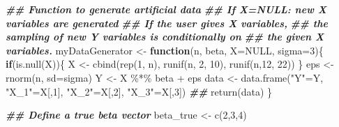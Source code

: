 \documentclass[
  14pt,
]{memoir}
\newenvironment{Shaded}{\begin{snugshade}}{\end{snugshade}}
\newcommand{\AttributeTok}[1]{\textcolor[rgb]{0.77,0.63,0.00}{#1}}
\newcommand{\ConstantTok}[1]{\textcolor[rgb]{0.00,0.00,0.00}{#1}}
\newcommand{\ControlFlowTok}[1]{\textcolor[rgb]{0.13,0.29,0.53}{\textbf{#1}}}
\newcommand{\DecValTok}[1]{\textcolor[rgb]{0.00,0.00,0.81}{#1}}
\newcommand{\DocumentationTok}[1]{\textcolor[rgb]{0.56,0.35,0.01}{\textbf{\textit{#1}}}}
\newcommand{\FunctionTok}[1]{\textcolor[rgb]{0.00,0.00,0.00}{#1}}
\newcommand{\NormalTok}[1]{#1}
\newcommand{\OtherTok}[1]{\textcolor[rgb]{0.56,0.35,0.01}{#1}}
\newcommand{\SpecialCharTok}[1]{\textcolor[rgb]{0.00,0.00,0.00}{#1}}
\newcommand{\StringTok}[1]{\textcolor[rgb]{0.31,0.60,0.02}{#1}}
\begin{document}
\begin{Shaded}
\begin{Highlighting}[]
\DocumentationTok{\#\# Function to generate artificial data}
\DocumentationTok{\#\# If X=NULL: new X variables are generated}
\DocumentationTok{\#\# If the user gives X variables, }
\DocumentationTok{\#\# the sampling of new Y variables is conditionally on }
\DocumentationTok{\#\# the given X variables.}
\NormalTok{myDataGenerator }\OtherTok{\textless{}{-}} \ControlFlowTok{function}\NormalTok{(n, beta, }\AttributeTok{X=}\ConstantTok{NULL}\NormalTok{, }\AttributeTok{sigma=}\DecValTok{3}\NormalTok{)\{}
  \ControlFlowTok{if}\NormalTok{(}\FunctionTok{is.null}\NormalTok{(X))\{}
\NormalTok{    X   }\OtherTok{\textless{}{-}} \FunctionTok{cbind}\NormalTok{(}\FunctionTok{rep}\NormalTok{(}\DecValTok{1}\NormalTok{, n), }
                 \FunctionTok{runif}\NormalTok{(n, }\DecValTok{2}\NormalTok{, }\DecValTok{10}\NormalTok{), }
                 \FunctionTok{runif}\NormalTok{(n,}\DecValTok{12}\NormalTok{, }\DecValTok{22}\NormalTok{))}
\NormalTok{  \}}
\NormalTok{  eps  }\OtherTok{\textless{}{-}} \FunctionTok{rnorm}\NormalTok{(n, }\AttributeTok{sd=}\NormalTok{sigma)}
\NormalTok{  Y    }\OtherTok{\textless{}{-}}\NormalTok{ X }\SpecialCharTok{\%*\%}\NormalTok{ beta }\SpecialCharTok{+}\NormalTok{ eps}
\NormalTok{  data }\OtherTok{\textless{}{-}} \FunctionTok{data.frame}\NormalTok{(}\StringTok{"Y"}\OtherTok{=}\NormalTok{Y, }
                     \StringTok{"X\_1"}\OtherTok{=}\NormalTok{X[,}\DecValTok{1}\NormalTok{], }\StringTok{"X\_2"}\OtherTok{=}\NormalTok{X[,}\DecValTok{2}\NormalTok{], }\StringTok{"X\_3"}\OtherTok{=}\NormalTok{X[,}\DecValTok{3}\NormalTok{])}
  \DocumentationTok{\#\#}
  \FunctionTok{return}\NormalTok{(data)}
\NormalTok{\}}

\DocumentationTok{\#\# Define a true beta vector}
\NormalTok{beta\_true }\OtherTok{\textless{}{-}} \FunctionTok{c}\NormalTok{(}\DecValTok{2}\NormalTok{,}\DecValTok{3}\NormalTok{,}\DecValTok{4}\NormalTok{)}


\end{Highlighting}
\end{Shaded}
\end{document}

